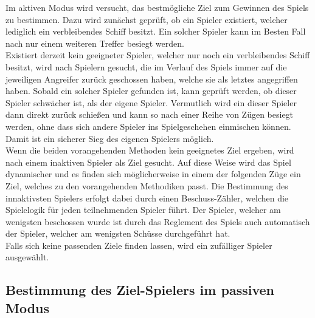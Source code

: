 Im aktiven Modus wird versucht, das bestmögliche Ziel zum Gewinnen des Spiels zu bestimmen. Dazu wird zunächst geprüft, ob ein Spieler existiert, welcher lediglich ein verbleibendes Schiff besitzt. Ein solcher Spieler kann im Besten Fall nach nur einem weiteren Treffer besiegt werden. \\
Existiert derzeit kein geeigneter Spieler, welcher nur noch ein verbleibendes Schiff besitzt, wird nach Spielern gesucht, die im Verlauf des Spiels immer auf die jeweiligen Angreifer zurück geschossen haben, welche sie als letztes angegriffen haben. Sobald ein solcher Spieler gefunden ist, kann geprüft werden, ob dieser Spieler schwächer ist, als der eigene Spieler. Vermutlich wird ein dieser Spieler dann direkt zurück schießen und kann so nach einer Reihe von Zügen besiegt werden, ohne dass sich andere Spieler ins Spielgeschehen einmischen können. Damit ist ein sicherer Sieg des eigenen Spielers möglich.\\
Wenn die beiden vorangehenden Methoden kein geeignetes Ziel ergeben, wird nach einem inaktiven Spieler als Ziel gesucht. Auf diese Weise wird das Spiel dynamischer und es finden sich möglicherweise in einem der folgenden Züge ein Ziel, welches zu den vorangehenden Methodiken passt. Die Bestimmung des innaktivsten Spielers erfolgt dabei durch einen Beschuss-Zähler, welchen die Spielelogik für jeden teilnehmenden Spieler führt. Der Spieler, welcher am wenigsten beschossen wurde ist durch das Reglement des Spiels auch automatisch der Spieler, welcher am wenigsten Schüsse durchgeführt hat.\\
Falls sich keine passenden Ziele finden lassen, wird ein zufälliger Spieler ausgewählt.\\

\subsection{Bestimmung des Ziel-Spielers im passiven Modus}

